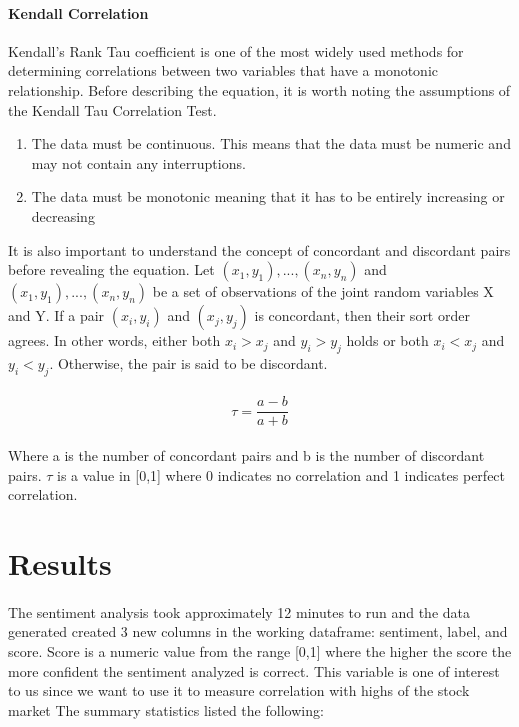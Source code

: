 \documentclass[12pt, letterpaper, titlepage]{article}
\begin{document}
\paragraph{Kendall Correlation}
Kendall's Rank Tau coefficient is one of the most widely used methods for determining correlations between two variables that have a monotonic relationship. Before describing the equation, it is worth noting the assumptions of the Kendall Tau Correlation Test.
\begin{enumerate}
	\item The data must be continuous. This means that the data must be numeric and may not contain any interruptions.
	\item The data must be monotonic meaning that it has to be entirely increasing or decreasing
	\end{enumerate}
It is also important to understand the concept of concordant and discordant pairs before revealing the equation. Let  $(x_{1},y_{1}),...,(x_{n},y_{n}) $ and $(x_{1},y_{1}),...,(x_{n},y_{n})$ be a set of observations of the joint random variables X and Y.  If a pair $(x_{i},y_{i})$ and $(x_{j},y_{j})$ is concordant, then their sort order agrees. In other words, either both $ x_{i}>x_{j}$ and  $y_{i}>y_{j}$ holds or both $x_{i}<x_{j}$ and $y_{i}<y_{j}$. Otherwise, the pair is said to be discordant.

\paragraph{}
\begin{equation}
  \label{eq:Kendall}
   \tau = \frac{a-b}{a + b}
\end{equation}


\paragraph{}
Where a is the number of concordant pairs and b is the number of discordant pairs. $\tau$ is a value in [0,1] where 0 indicates no correlation and 1 indicates perfect correlation.

\label{sec: results}
\section{Results}
\paragraph{}
The sentiment analysis took approximately 12 minutes to run and the data generated created 3 new columns in the working dataframe: sentiment, label, and score. Score is a numeric value from the range [0,1] where the higher the score the more confident the sentiment analyzed is correct. This variable is one of interest to us since we want to use it to measure correlation with highs of the stock market The summary statistics listed the following:
\end{document}
